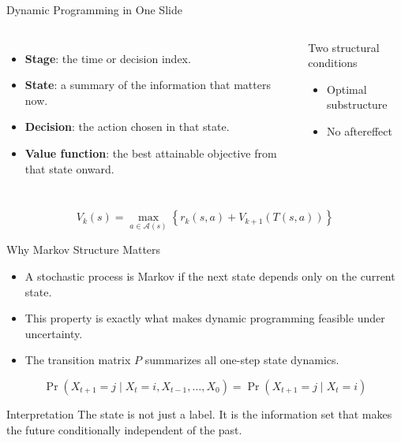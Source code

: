 \documentclass[aspectratio=169,11pt]{beamer}
\begin{document}
\begin{frame}{Dynamic Programming in One Slide}
  \begin{columns}[T]
    \begin{itemize}
      \item \textbf{Stage}: the time or decision index.
      \item \textbf{State}: a summary of the information that matters now.
      \item \textbf{Decision}: the action chosen in that state.
      \item \textbf{Value function}: the best attainable objective from that state onward.
    \end{itemize}

    \begin{block}{Two structural conditions}
      \begin{itemize}
        \item Optimal substructure
        \item No aftereffect
      \end{itemize}
    \end{block}
  \end{columns}

  \vspace{0.3cm}
  \[
    V_k(s) = \max_{a \in \mathcal{A}(s)} \left\{ r_k(s,a) + V_{k+1}(T(s,a)) \right\}
  \]
\end{frame}

\begin{frame}{Why Markov Structure Matters}
  \begin{itemize}
    \item A stochastic process is Markov if the next state depends only on the current state.
    \item This property is exactly what makes dynamic programming feasible under uncertainty.
    \item The transition matrix \(P\) summarizes all one-step state dynamics.
  \end{itemize}

  \[
    \Pr(X_{t+1}=j \mid X_t=i, X_{t-1}, \dots, X_0)
    =
    \Pr(X_{t+1}=j \mid X_t=i)
  \]

  \begin{block}{Interpretation}
    The state is not just a label. It is the information set that makes the future conditionally independent of the past.
  \end{block}
\end{frame}
\end{document}
